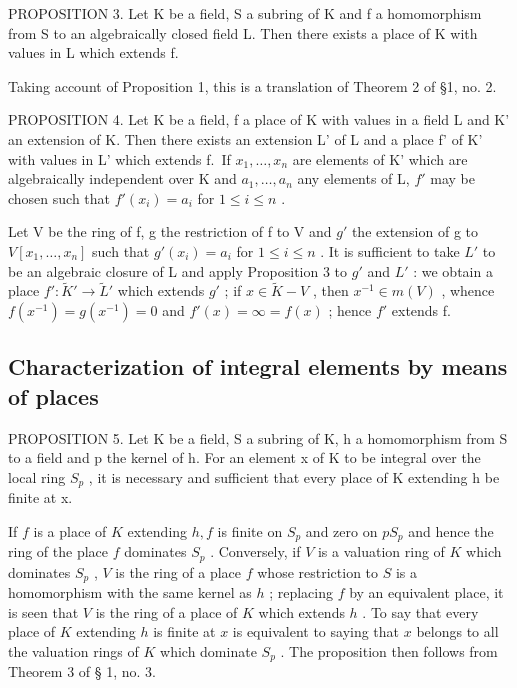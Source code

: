 PROPOSITION 3. Let K be a field, S a subring of K and f a homomorphism from S to an algebraically closed field L. Then there exists a place of K with values in L which extends f.

Taking account of Proposition 1, this is a translation of Theorem 2 of §1, no. 2.

PROPOSITION 4. Let K be a field, f a place of K with values in a field L and K' an extension of K. Then there exists an extension L' of L and a place f' of K' with values in L' which extends f.~If \(x_{1}, \ldots, x_{n}\) are elements of K' which are algebraically independent over K and \(a_1, \ldots, a_n\) any elements of L, \(f'\) may be chosen such that \(f'(x_i) = a_i\) for \(1 \leqslant i \leqslant n\) .

Let V be the ring of f, g the restriction of f to V and \(g'\) the extension of g to \(V[x_{1},\ldots,x_{n}]\) such that \(g'(x_{i}) = a_{i}\) for \(1 \leqslant i \leqslant n\) . It is sufficient to take \(L'\) to be an algebraic closure of L and apply Proposition 3 to \(g'\) and \(L'\) : we obtain a place \(f'\colon \tilde{K}' \to \tilde{L}'\) which extends \(g'\) ; if \(x \in \tilde{K} - V\) , then \(x^{-1} \in m(V)\) , whence \(f(x^{-1}) = g(x^{-1}) = 0\) and \(f'(x) = \infty = f(x)\) ; hence \(f'\) extends f.

\subsection{Characterization of integral elements by means of places}

PROPOSITION 5. Let K be a field, S a subring of K, h a homomorphism from S to a field and p the kernel of h. For an element x of K to be integral over the local ring \(S_{p}\) , it is necessary and sufficient that every place of K extending h be finite at x.

If \(f\) is a place of \(K\) extending \(h, f\) is finite on \(S_p\) and zero on \(pS_p\) and hence the ring of the place \(f\) dominates \(S_p\) . Conversely, if \(V\) is a valuation ring of \(K\) which dominates \(S_p\) , \(V\) is the ring of a place \(f\) whose restriction to \(S\) is a homomorphism with the same kernel as \(h\) ; replacing \(f\) by an equivalent place, it is seen that \(V\) is the ring of a place of \(K\) which extends \(h\) . To say that every place of \(K\) extending \(h\) is finite at \(x\) is equivalent to saying that \(x\) belongs to all the valuation rings of \(K\) which dominate \(S_p\) . The proposition then follows from Theorem 3 of § 1, no. 3.

